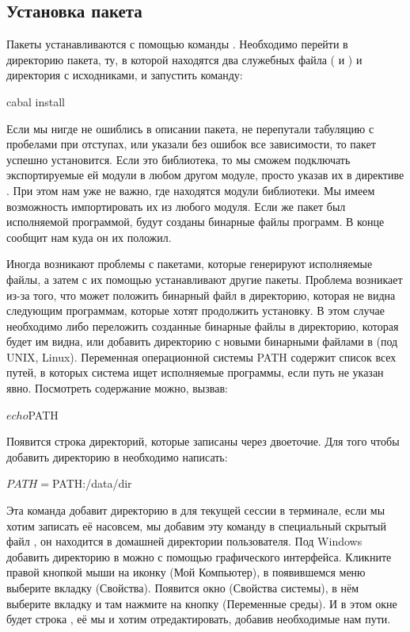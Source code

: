 \subsection{Установка пакета}

Пакеты устанавливаются с помощью команды . 
Необходимо перейти в директорию пакета, ту, в которой
находятся два служебных файла ( и ) и 
директория с исходниками, и запустить команду:

\begin{code}
cabal install
\end{code}

Если мы нигде не ошиблись в описании пакета, не перепутали
табуляцию с пробелами при отступах, или указали без ошибок
все зависимости, то пакет успешно установится. Если это библиотека,
то мы сможем подключать экспортируемые ей модули в любом другом
модуле, просто указав их в директиве . При этом
нам уже не важно, где находятся модули библиотеки. Мы имеем
возможность импортировать их из любого модуля. Если же пакет
был исполняемой программой, будут созданы бинарные файлы
программ. В конце  сообщит нам куда он их положил. 

Иногда возникают проблемы с пакетами, которые генерируют 
исполняемые файлы, а затем с их помощью устанавливают другие
пакеты. Проблема возникает из-за того, что  может
положить бинарный файл в директорию, которая не видна следующим
программам, которые хотят продолжить установку. В этом случае 
необходимо либо переложить созданные бинарные файлы в директорию,
которая будет им видна, или добавить директорию с новыми
бинарными файлами в  (под UNIX, Linux). Переменная
операционной системы PATH содержит список всех путей, в которых
система ищет исполняемые программы, если путь не указан явно.
Посмотреть содержание  можно, вызвав:

\begin{code}
$ echo $PATH
\end{code}

Появится строка директорий, которые записаны через двоеточие.
Для того чтобы добавить директорию  в  необходимо
написать: 

\begin{code}
$ PATH=$PATH:/data/dir
\end{code}

Эта команда добавит директорию в  для текущей
сессии в терминале, если мы хотим записать её насовсем, мы 
добавим эту команду в специальный скрытый файл , 
он находится в домашней директории пользователя.
Под Windows добавить директорию в  можно с помощью
графического интерфейса. Кликните правой кнопкой мыши на иконку
 (Мой Компьютер), в появившемся меню выберите вкладку
 (Свойства). Появится окно 
(Свойства системы), в нём выберите вкладку  и там 
нажмите на кнопку  (Переменные среды). 
И в этом окне будет строка , её мы и хотим отредактировать,
добавив необходимые нам пути.

